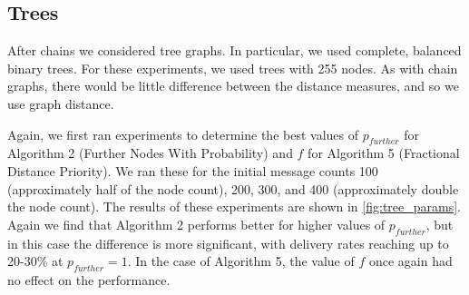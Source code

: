 \documentclass[bsc,frontabs,twoside,singlespacing,parskip,deptreport]{infthesis}     %
\begin{document}
\subsection{Trees}
After chains we considered tree graphs. In particular, we used complete, balanced binary trees. For these experiments, we used trees with 255 nodes. As with chain graphs, there would be little difference between the distance measures, and so we use graph distance.

Again, we first ran experiments to determine the best values of $p_{further}$ for Algorithm 2 (Further Nodes With Probability) and $f$ for Algorithm 5 (Fractional Distance Priority). We ran these for the initial message counts 100 (approximately half of the node count), 200, 300, and 400 (approximately double the node count). The results of these experiments are shown in \ref{fig:tree_params}. Again we find that Algorithm 2 performs better for higher values of $p_{further}$, but in this case the difference is more significant, with delivery rates reaching up to 20-30\% at $p_{further}=1$. In the case of Algorithm 5, the value of $f$ once again had no effect on the performance.
\end{document}
